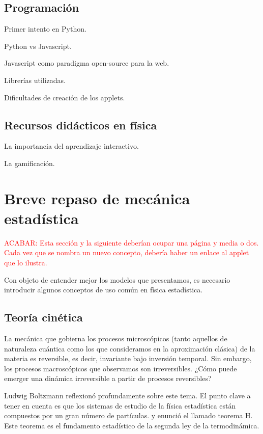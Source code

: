 \documentclass[11pt, a4paper]{article} %
\theoremstyle{named}
\begin{document}
    \subsection{Programación}\label{sec:code}

        Primer intento en Python.

        Python vs Javascript.

        Javascript como paradigma open-source para la web.

        Librerías utilizadas.

        Dificultades de creación de los applets.

    \subsection{Recursos didácticos en física}

        La importancia del aprendizaje interactivo.

        La gamificación.

\newpage
\section{Breve repaso de mecánica estadística}

    \textcolor{red}{ACABAR: Esta sección y la siguiente deberían ocupar una página y media o dos. Cada vez que se nombra un nuevo concepto, debería haber un enlace al applet que lo ilustra.}

    Con objeto de entender mejor los modelos que presentamos, es necesario introducir algunos conceptos de uso común en física estadística.

    \subsection{Teoría cinética}

    La mecánica que gobierna los procesos microscópicos (tanto aquellos de naturaleza cuántica como los que consideramos en la aproximación clásica) de la materia es reversible, es decir, invariante bajo inversión temporal. Sin embargo, los procesos macroscópicos que observamos son irreversibles. ¿Cómo puede emerger una dinámica irreversible a partir de procesos reversibles?

    Ludwig Boltzmann reflexionó profundamente sobre este tema. El punto clave a tener en cuenta es que los sistemas de estudio de la física estadística están compuestos por un gran número de partículas. y enunció el llamado teorema H. Este teorema es el fundamento estadístico de la segunda ley de la termodinámica.
\end{document}

